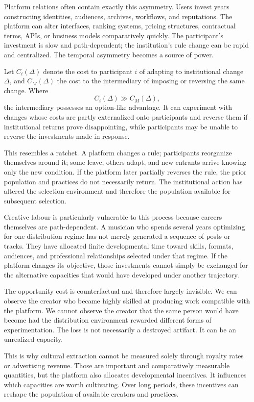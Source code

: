 \documentclass[11pt]{article}
\begin{document}
Platform relations often contain exactly this asymmetry. Users invest years constructing identities, audiences, archives, workflows, and reputations. The platform can alter interfaces, ranking systems, pricing structures, contractual terms, APIs, or business models comparatively quickly. The participant's investment is slow and path-dependent; the institution's rule change can be rapid and centralized. The temporal asymmetry becomes a source of power.

Let \(C_i(\Delta)\) denote the cost to participant \(i\) of adapting to institutional change \(\Delta\), and \(C_M(\Delta)\) the cost to the intermediary of imposing or reversing the same change. Where
\[
C_i(\Delta)\gg C_M(\Delta),
\]
the intermediary possesses an option-like advantage. It can experiment with changes whose costs are partly externalized onto participants and reverse them if institutional returns prove disappointing, while participants may be unable to reverse the investments made in response.

This resembles a ratchet. A platform changes a rule; participants reorganize themselves around it; some leave, others adapt, and new entrants arrive knowing only the new condition. If the platform later partially reverses the rule, the prior population and practices do not necessarily return. The institutional action has altered the selection environment and therefore the population available for subsequent selection.

Creative labour is particularly vulnerable to this process because careers themselves are path-dependent. A musician who spends several years optimizing for one distribution regime has not merely generated a sequence of posts or tracks. They have allocated finite developmental time toward skills, formats, audiences, and professional relationships selected under that regime. If the platform changes its objective, those investments cannot simply be exchanged for the alternative capacities that would have developed under another trajectory.

The opportunity cost is counterfactual and therefore largely invisible. We can observe the creator who became highly skilled at producing work compatible with the platform. We cannot observe the creator that the same person would have become had the distribution environment rewarded different forms of experimentation. The loss is not necessarily a destroyed artifact. It can be an unrealized capacity.

This is why cultural extraction cannot be measured solely through royalty rates or advertising revenue. Those are important and comparatively measurable quantities, but the platform also allocates developmental incentives. It influences which capacities are worth cultivating. Over long periods, these incentives can reshape the population of available creators and practices.
\end{document}
